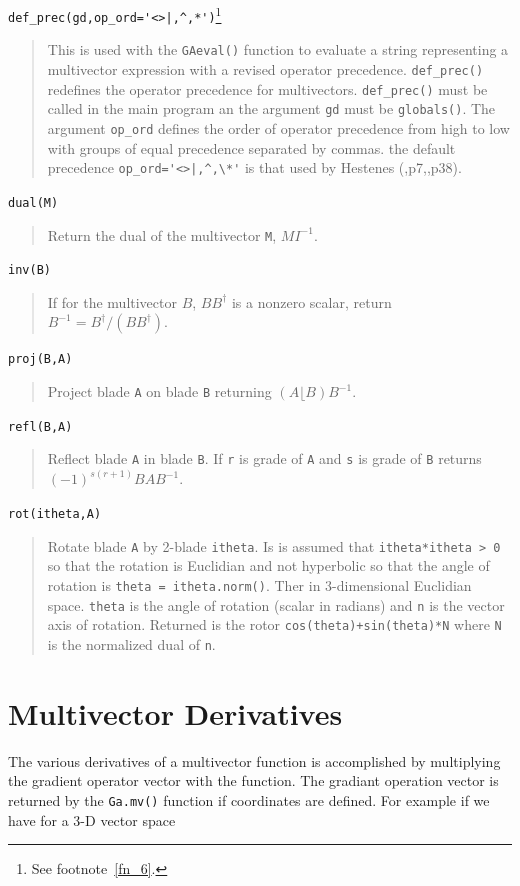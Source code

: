 \documentclass[12pt]{report}
\newcommand{\lp}{\left (}
\newcommand{\rp}{\right )}
\newcommand{\R}{\dagger}
\newcommand{\paren}[1]{\lp {#1} \rp}
\newcommand{\T}[1]{\texttt{#1}}
\begin{document}
\lstinline$def_prec(gd,op_ord='<>|,^,*')$\footnote{See footnote~\ref{fn_6}.}
\begin{quote}
   This is used with the \T{GAeval()} function to evaluate a string representing a multivector
   expression with a revised operator precedence.  \T{def\_prec()} redefines the operator
   precedence for multivectors. \T{def\_prec()} must be called in the main program an the
   argument \T{gd} must be \T{globals()}.  The argument \T{op\_ord} defines the order of operator
   precedence from high to low with groups of equal precedence separated by commas. the default
   precedence \lstinline$op_ord='<>|,^,\*'$ is that used by Hestenes (\cite{Hestenes},p7,\cite{Doran},p38).
\end{quote}
\T{dual(M)}
\begin{quote}
   Return the dual of the multivector \T{M}, $MI^{-1}$.
\end{quote}
\T{inv(B)}
\begin{quote}
   If for the multivector $B$, $BB^{\R}$ is a nonzero scalar, return $B^{-1} = B^{\R}/(BB^{\R})$.
\end{quote}
\T{proj(B,A)}
\begin{quote}
   Project blade \T{A} on blade \T{B} returning $\paren{A\lfloor B}B^{-1}$.
\end{quote}
\T{refl(B,A)}
\begin{quote}
   Reflect blade \T{A} in blade \T{B}. If \T{r} is grade of \T{A} and \T{s} is grade of \T{B}
   returns $(-1)^{s(r+1)}BAB^{-1}$.
\end{quote}
\T{rot(itheta,A)}
\begin{quote}
   Rotate blade \T{A} by 2-blade \T{itheta}.  Is is assumed that \T{itheta*itheta > 0} so that
   the rotation is Euclidian and not hyperbolic so that the angle of
   rotation is \T{theta = itheta.norm()}.  Ther in 3-dimensional Euclidian space. \T{theta} is the angle of rotation (scalar in radians) and
   \T{n} is the vector axis of rotation.  Returned is the rotor \T{cos(theta)+sin(theta)*N} where \T{N} is
   the normalized dual of \T{n}.
\end{quote}

\section{Multivector Derivatives}

The various derivatives of a multivector function is accomplished by
multiplying the gradient operator vector with the function.  The gradiant
operation vector is returned by the \T{Ga.mv()} function if coordinates
are defined.  For example if we have for a 3-D vector space
\end{document}
